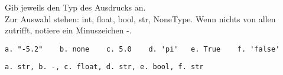 \question[3]
Gib jeweils den Typ des Ausdrucks an. \\
Zur Auswahl stehen: int, float, bool, str, NoneType. Wenn nichts von allen zutrifft, notiere
ein Minuszeichen -.
\begin{lstlisting}
a. "-5.2"    b. none    c. 5.0    d. 'pi'   e. True    f. 'false'
\end{lstlisting}
\begin{solutionbox}{2cm}
\begin{lstlisting}
a. str, b. -, c. float, d. str, e. bool, f. str
\end{lstlisting}
\end{solutionbox}
